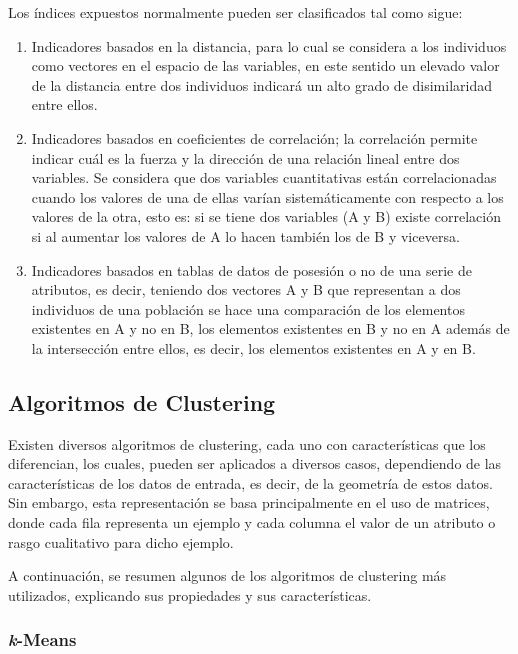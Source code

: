Los índices expuestos normalmente pueden ser clasificados tal como sigue:

\begin{enumerate}
	
	\item  Indicadores basados en la distancia, para lo cual se considera a los individuos como vectores en el espacio de las variables, en este sentido un elevado valor de la distancia entre dos individuos indicará un alto grado de disimilaridad entre ellos.
	
	\item Indicadores basados en coeficientes de correlación; la correlación permite indicar cuál es la fuerza y la dirección de una relación lineal entre dos variables. Se considera que dos variables cuantitativas están correlacionadas cuando los valores de una de ellas varían sistemáticamente con respecto a los valores de la otra, esto es: si se tiene dos variables (A y B) existe correlación si al aumentar los valores de A lo hacen también los de B y viceversa.
	
	\item Indicadores basados en tablas de datos de posesión o no de una serie de atributos, es decir, teniendo dos vectores A y B que representan a dos individuos de una población se hace una comparación de los elementos existentes en A y no en B, los elementos existentes en B y no en A además de la intersección entre ellos, es decir, los elementos existentes en A y en B. 
	
\end{enumerate}

\subsection{Algoritmos de Clustering}

Existen diversos algoritmos de clustering, cada uno con características que los diferencian, los cuales, pueden ser aplicados a diversos casos, dependiendo de las características de los datos de entrada, es decir, de la geometría de estos datos. Sin embargo, esta representación se basa principalmente en el uso de matrices, donde cada fila representa un ejemplo y cada columna el valor de un atributo o rasgo cualitativo para dicho ejemplo.

A continuación, se resumen algunos de los algoritmos de clustering más utilizados, explicando sus propiedades y sus características.

\subsubsection{\textit{k}-Means}

